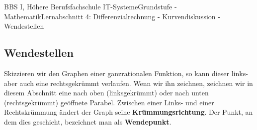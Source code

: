 \documentclass[11pt,twocolumn,oneside,openany,headings=optiontotoc,11pt,numbers=noenddot]{article}
\begin{document}
	\begin{worksheet}{BBS I, Höhere Berufsfachschule IT-Systeme}{Grundstufe - Mathematik}{Lernabschnitt 4: Differenzialrechnung - Kurvendiskussion - Wendestellen}
		\setcounter{section}{7}
		\setcounter{subsection}{4}
		\subsection{Wendestellen}
		Skizzieren wir den Graphen einer ganzrationalen Funktion, so kann dieser links- aber auch eine rechtsgekrümmt verlaufen. Wenn wir ihn zeichnen, zeichnen wir in diesem Abschnitt eine nach oben (linksgekrümmt) oder nach unten (rechtsgekrümmt) geöffnete Parabel. Zwischen einer Links- und einer Rechtskrümmung ändert der Graph seine \textbf{Krümmungsrichtung}. Der Punkt, an dem dies geschieht, bezeichnet man als \textbf{Wendepunkt}.

\end{worksheet}
\end{document}
